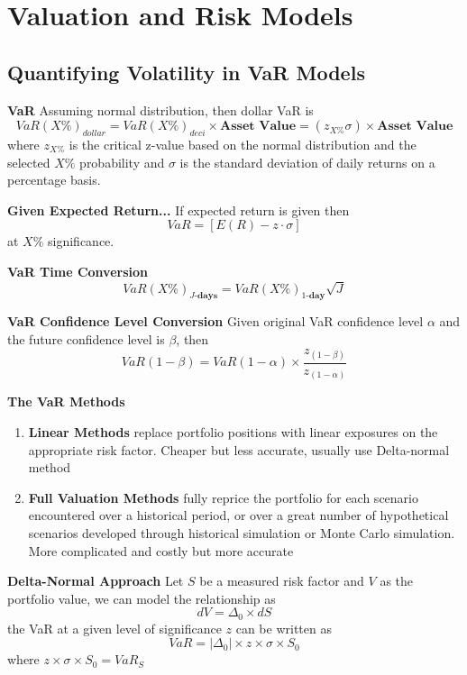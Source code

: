 \documentclass[11pt,fleqn]{report} %
\numberwithin{equation}{section} %
\numberwithin{figure}{section} %
\numberwithin{table}{section} %
\begin{document}
 \part{Valuation and Risk Models}

\chapter{Quantifying Volatility in VaR Models}
\begin{definition}\textbf{VaR}
Assuming normal distribution, then dollar VaR is
    $$
    VaR(X\%)_{dollar}=VaR(X\%)_{deci}\times\textbf{Asset Value}=(z_{X\%}\sigma)\times\textbf{Asset Value}
    $$
    where $z_{X\%}$ is the critical z-value based on the normal distribution and the selected $X\%$ probability and $\sigma$ is the standard deviation of daily returns on a percentage basis.
\end{definition}
\begin{remark}\textbf{Given Expected Return...}
If expected return is given then
$$
VaR=[E(R)-z\cdot\sigma]
$$
at $X\%$ significance.
\end{remark}
\begin{theorem}\textbf{VaR Time Conversion}
$$
VaR(X\%)_{J\textbf{-days}}=VaR(X\%)_{1\textbf{-day}}\sqrt{J}
$$
\end{theorem}
\begin{theorem}\textbf{VaR Confidence Level Conversion}
Given original VaR confidence level $\alpha$ and the future confidence level is $\beta$, then
$$
VaR(1-\beta)=VaR(1-\alpha)\times\frac{z_{(1-\beta)}}{z_{(1-\alpha)}}
$$
\end{theorem}
\begin{definition}\textbf{The VaR Methods}
\begin{enumerate}
    \item \textbf{Linear Methods} replace portfolio positions with linear exposures on the appropriate risk factor. Cheaper but less accurate, usually use Delta-normal method
    \item \textbf{Full Valuation Methods} fully reprice the portfolio for each scenario encountered over a historical period, or over a great number of hypothetical scenarios developed through historical simulation or Monte Carlo simulation. More complicated and costly but more accurate
\end{enumerate}
\end{definition}
\begin{definition}\textbf{Delta-Normal Approach}
Let $S$ be a measured risk factor and $V$ as the portfolio value, we can model the relationship as
$$
dV=\Delta_0\times dS
$$
the VaR at a given level of significance $z$ can be written as
$$
VaR=|\Delta_0|\times z\times\sigma\times S_0
$$
where $z\times\sigma\times S_0=VaR_S$
\end{definition}
\end{document}
